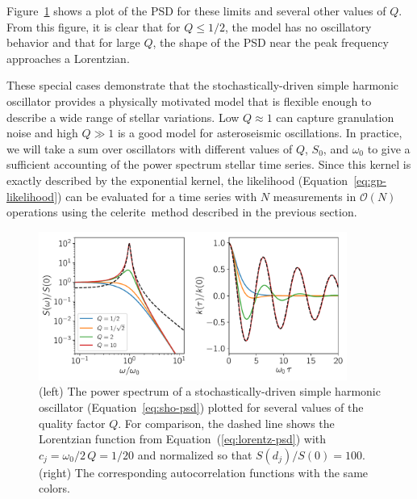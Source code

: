 \documentclass[manuscript, letterpaper]{aastex6}
\makeatletter
\let\origsection\section
\renewcommand\section{\@ifstar{\starsection}{\nostarsection}}
\newcommand\nostarsection[1]{\sectionprelude\origsection{#1}}
\newcommand\starsection[1]{\sectionprelude\origsection*{#1}}
\newcommand\sectionprelude{\vspace{1em}}
\newcommand{\project}[1]{\textsf{#1}}
\newcommand{\celerite}{\project{celerite}}
\newcommand{\figureref}[1]{\ref{fig:#1}}
\newcommand{\Figure}[1]{Figure~\figureref{#1}}
\newcommand{\figurelabel}[1]{\label{fig:#1}}
\renewcommand{\eqref}[1]{\ref{eq:#1}}
\newcommand{\Eq}[1]{Equation~(\eqref{#1})}
\newcommand{\eq}[1]{\Eq{#1}}
\newcommand{\eqalt}[1]{Equation~\eqref{#1}}
\makeatother
\begin{document}
\Figure{sho} shows a plot of the PSD for these limits and several other values
of $Q$.
From this figure, it is clear that for $Q \le 1/2$, the model has no
oscillatory behavior and that for large $Q$, the shape of the PSD near the
peak frequency approaches a Lorentzian.

These special cases demonstrate that the stochastically-driven simple harmonic
oscillator provides a physically motivated model that is flexible enough to
describe a wide range of stellar variations.
Low $Q \approx 1$ can capture granulation noise and high $Q \gg 1$ is a good
model for asteroseismic oscillations.
In practice, we will take a sum over oscillators with different values of $Q$,
$S_0$, and $\omega_0$ to give a sufficient accounting of the power spectrum
stellar time series.
Since this kernel is exactly described by the exponential kernel, the
likelihood (\eqalt{gp-likelihood}) can be evaluated for a time series with $N$
measurements in $\mathcal{O}(N)$ operations using the \celerite\ method
described in the previous section.

\begin{figure}[!htbp]
\begin{center}
\includegraphics[width=0.9\textwidth]{figures/sho.pdf}
\caption{(left) The power spectrum of a stochastically-driven simple harmonic
    oscillator (\eqalt{sho-psd}) plotted for several values of the quality
    factor $Q$.
    For comparison, the dashed line shows the Lorentzian function from
    \eq{lorentz-psd} with $c_j = \omega_0/2\,Q = 1/20$ and normalized so that
    $S(d_j)/S(0) = 100$.
    (right) The corresponding autocorrelation functions with the same colors.
    \figurelabel{sho}}
\end{center}
\end{figure}


\section{Examples with simulated data}
\end{document}
